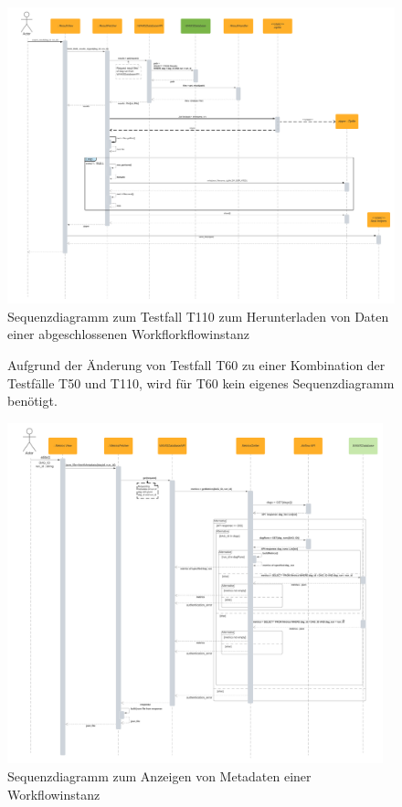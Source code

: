 \begin{figure}[ht]
    \centering
    \includegraphics[width=\textwidth]{Diagramme/Sequenzdiagramm T110.png}
    \caption{Sequenzdiagramm zum Testfall T110 zum Herunterladen von Daten einer abgeschlossenen Workflorkflowinstanz}
    \label{fig:SQD_T110}
\end{figure}

\begin{figure}[ht]
    Aufgrund der Änderung von Testfall T60 zu einer Kombination der Testfälle T50 und T110, wird  für T60 kein eigenes Sequenzdiagramm benötigt.
    \label{fig:T60}
\end{figure}

\begin{figure}[ht]
    \centering
    \includegraphics[width=0.97\textwidth]{Diagramme/Sequenzdiagramm MetadataFetcher.png}
    \caption{Sequenzdiagramm zum Anzeigen von Metadaten einer Workflowinstanz}
    \label{fig:SQD_MetadataFetcher}
\end{figure}



